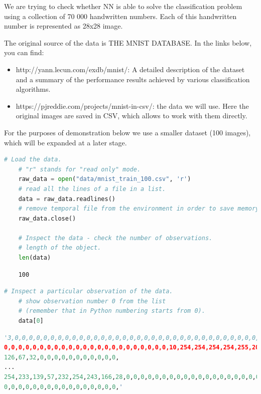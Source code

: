 We are trying to check whether NN is able to solve the classification problem using a collection of 70 000 handwritten numbers. Each of this handwritten number is represented as 28x28 image. 

The original source of the data is THE MNIST DATABASE. In the links below, you can find: 

\begin{itemize}
    \item http://yann.lecun.com/exdb/mnist/: A detailed description of the dataset and a summary of the performance results achieved by various classification algorithms.
    \item https://pjreddie.com/projects/mnist-in-csv/: the data we will use. Here the original images are saved in CSV, which allows to work with them directly.
\end{itemize}

For the purposes of demonstration below we use a smaller dataset (100 images), which will be expanded at a later stage.


\begin{lstlisting}[language=Python]
    # Load the data.
    # "r" stands for "read only" mode.
    raw_data = open("data/mnist_train_100.csv", 'r') 
    # read all the lines of a file in a list.
    data = raw_data.readlines() 
    # remove temporal file from the environment in order to save memory.
    raw_data.close() 

    # Inspect the data - check the number of observations.
    # length of the object.
    len(data) 
\end{lstlisting}

\begin{lstlisting}
    100
\end{lstlisting}

\begin{lstlisting}[language=Python]
    # Inspect a particular observation of the data.
    # show observation number 0 from the list
    # (remember that in Python numbering starts from 0).
    data[0]
\end{lstlisting}

\begin{lstlisting}[language=Python]
'3,0,0,0,0,0,0,0,0,0,0,0,0,0,0,0,0,0,0,0,0,0,0,0,0,0,0,0,0,0,0,0,0,0,0,
0,0,0,0,0,0,0,0,0,0,0,0,0,0,0,0,0,0,0,0,0,0,0,10,254,254,254,254,255,209,
126,67,32,0,0,0,0,0,0,0,0,0,0,0,
...
254,233,139,57,232,254,243,166,28,0,0,0,0,0,0,0,0,0,0,0,0,0,0,0,0,0,0,0,0,
0,0,0,0,0,0,0,0,0,0,0,0,0,0,0,0,'
\end{lstlisting}

